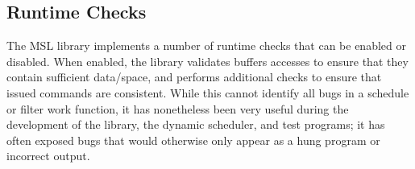 \subsection{Runtime Checks}

The MSL library implements a number of runtime checks that can be
enabled or disabled. When enabled, the library validates buffers
accesses to ensure that they contain sufficient data/space, and
performs additional checks to ensure that issued commands are
consistent. While this cannot identify all bugs in a schedule or
filter work function, it has nonetheless been very useful during the
development of the library, the dynamic scheduler, and test programs;
it has often exposed bugs that would otherwise only appear as a hung
program or incorrect output.

